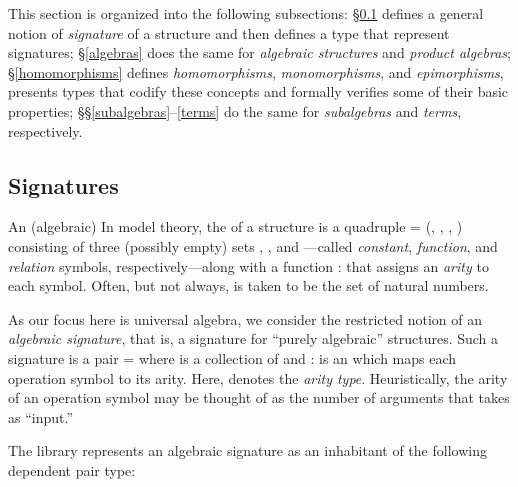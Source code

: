 \ifshort\else
This section is organized into the following subsections:
§\ref{signatures} defines a general notion of \emph{signature} of a structure and then defines a type that represent signatures;
§\ref{algebras} does the same for \emph{algebraic structures} and \emph{product algebras};
§\ref{homomorphisms} defines \emph{homomorphisms}, \emph{monomorphisms}, and \emph{epimorphisms}, presents types that codify these concepts and formally verifies some of their basic properties;
§§\ref{subalgebras}--\ref{terms} do the same for \emph{subalgebras} and \emph{terms}, respectively.
\fi

\subsection{Signatures}
\label{signatures}

\ifshort
An (algebraic) 
\else
In model theory, the  of a structure is a quadruple  = (,
, , ) consisting of three (possibly empty) sets , , and
---called \emph{constant}, \emph{function}, and \emph{relation} symbols,
respectively---along with a function  :  \as{+}  \as{+} 
  that assigns an \emph{arity} to each symbol. Often, but not always, 
is taken to be the set of natural numbers.

As our focus here is universal algebra, we consider the restricted notion of an
\emph{algebraic signature}, that is, a signature for ``purely algebraic'' structures. Such
a signature
\fi
is a pair  =  where  is a collection of
 and  :    is an 
which maps each operation symbol to its arity. Here,  denotes the \emph{arity type}.
Heuristically, the arity   of an operation symbol    may be
thought of as the number of arguments that  takes as ``input.''

The \agdaalgebras library represents an algebraic signature as an
inhabitant of the following dependent pair type:

